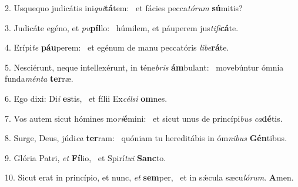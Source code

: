 2. Usquequo judicátis ini\textit{qui}\textbf{tá}tem: \ast\  et fácies pecca\textit{tó}\textit{rum} \textbf{sú}mitis?\

3. Judicáte egéno, et \textit{pu}\textbf{píl}lo: \ast\  húmilem, et páuperem jus\textit{ti}\textit{fi}\textbf{cá}te.\

4. Erípi\textit{te} \textbf{páu}perem: \ast\  et egénum de manu peccatóris \textit{li}\textit{be}\textbf{rá}te.\

5. Nesciérunt, neque intellexérunt, in téne\textit{bris} \textbf{ám}bulant: \ast\  movebúntur ómnia funda\textit{mén}\textit{ta} \textbf{ter}ræ.\

6. Ego dixi: Di\textit{i} \textbf{es}tis, \ast\  et fílii Ex\textit{cél}\textit{si} \textbf{om}nes.\

7. Vos autem sicut hómines mo\textit{ri}\textbf{é}mini: \ast\  et sicut unus de princípi\textit{bus} \textit{ca}\textbf{dé}tis.\

8. Surge, Deus, júdi\textit{ca} \textbf{ter}ram: \ast\  quóniam tu hereditábis in óm\textit{ni}\textit{bus} \textbf{Gén}tibus.\

9. Glória Patri, \textit{et} \textbf{Fí}lio, \ast\  et Spirí\textit{tu}\textit{i} \textbf{Sanc}to.\

10. Sicut erat in princípio, et nunc, \textit{et} \textbf{sem}per, \ast\  et in sǽcula sæcu\textit{ló}\textit{rum}. \textbf{A}men.\

